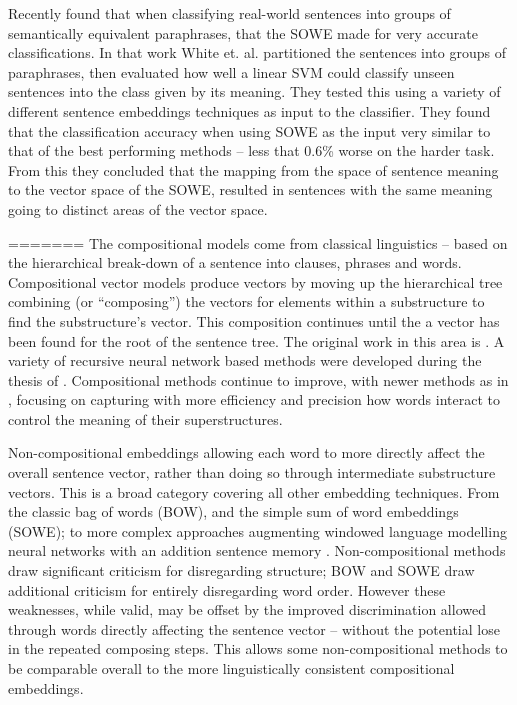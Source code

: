 \documentclass[11pt]{article}
\theoremstyle{plain}
\theoremstyle{definition}
\begin{document}
Recently \textcite{White2015SentVecMeaning} found that when classifying real-world sentences into groups of semantically equivalent paraphrases, that the SOWE made for very accurate classifications. In that work White et. al. partitioned the sentences into groups of paraphrases, then evaluated how well a linear SVM could classify unseen sentences into the class given by its meaning. They tested this using a variety of different sentence embeddings techniques as input to the classifier. They found that the classification accuracy when using SOWE as the input very similar to that of the best performing methods -- less that 0.6\% worse on the harder task. From this they concluded that the mapping from the space of sentence meaning to the vector space of the SOWE, resulted in sentences with the same meaning going to distinct areas of the vector space.

=======
The compositional models come from classical linguistics -- based on the hierarchical  break-down of a sentence into clauses, phrases and words. Compositional vector models produce vectors by moving up the hierarchical tree combining (or ``composing'') the vectors for elements within a substructure to find the substructure's vector. This composition continues until the a vector has been found for the root of the sentence tree. The original work in this area is \textcite{Mitchell2008}. A variety of recursive neural network based methods were developed during the thesis of \textcite{socher2014recursive}. Compositional methods continue to improve, with newer methods as in \textcite{TACL15CompVector}, focusing on capturing with more efficiency and precision how words interact to control the meaning of their superstructures. 



Non-compositional embeddings allowing each word to more directly affect the overall sentence vector, rather than doing so through intermediate substructure vectors. This is a broad category covering all other embedding techniques. From the classic bag of words (BOW), and the simple sum of word embeddings (SOWE); to more complex approaches augmenting windowed language modelling neural networks with an addition sentence memory \parencite{le2014distributed}.  Non-compositional methods draw significant criticism for disregarding structure; BOW and SOWE draw additional criticism for entirely disregarding word order. However these weaknesses, while valid, may be offset by the improved discrimination allowed through words directly affecting the sentence vector -- without the potential lose in the repeated composing steps. This allows some non-compositional methods to be comparable overall to the more linguistically consistent compositional embeddings. 
\end{document}
